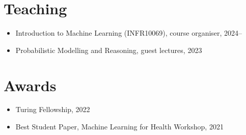 \documentclass[11pt,a4paper]{article}
\begin{document}
\section{Teaching}
\begin{itemize}
  \item Introduction to Machine Learning (INFR10069), course organiser, 2024--
  \item Probabilistic Modelling and Reasoning, guest lectures, 2023
\end{itemize}

\section{Awards}
\begin{itemize}
  \item Turing Fellowship, 2022
  \item Best Student Paper, Machine Learning for Health Workshop, 2021
\end{itemize}
\end{document}

